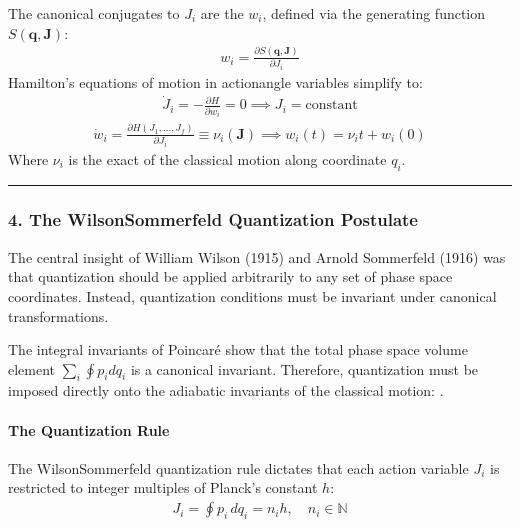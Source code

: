 \documentclass[letterpaper,10pt,english]{jupyterBook}
\begin{document}
\sphinxAtStartPar
The canonical conjugates to \(J_i\) are the  \(w_i\), defined via the generating function \(S(\mathbf{q}, \mathbf{J})\):
\begin{equation*}
\begin{split}
w_i = \frac{\partial S(\mathbf{q}, \mathbf{J})}{\partial J_i}
\end{split}
\end{equation*}
\sphinxAtStartPar
Hamilton’s equations of motion in action\sphinxhyphen{}angle variables simplify to:
\begin{equation*}
\begin{split}
\dot{J}_i = -\frac{\partial H}{\partial w_i} = 0 \implies J_i = \text{constant}
\end{split}
\end{equation*}\begin{equation*}
\begin{split}
\dot{w}_i = \frac{\partial H(J_1, \dots, J_f)}{\partial J_i} \equiv \nu_i (\mathbf{J}) \implies w_i(t) = \nu_i t + w_i(0)
\end{split}
\end{equation*}
\sphinxAtStartPar
Where \(\nu_i\) is the exact  of the classical motion along coordinate \(q_i\).


\bigskip\hrule\bigskip



\subsubsection{4. The Wilson\sphinxhyphen{}Sommerfeld Quantization Postulate}
\label{\detokenize{ch/quantum-mechanics/atom-models/analytical-mechanics-short:the-wilson-sommerfeld-quantization-postulate}}
\sphinxAtStartPar
The central insight of William Wilson (1915) and Arnold Sommerfeld (1916) was that quantization should  be applied arbitrarily to any set of phase space coordinates. Instead, quantization conditions must be invariant under canonical transformations.

\sphinxAtStartPar
The integral invariants of Poincaré show that the total phase space volume element \(\sum_i \oint p_i dq_i\) is a canonical invariant. Therefore, quantization must be imposed directly onto the adiabatic invariants of the classical motion: .


\paragraph{The Quantization Rule}
\label{\detokenize{ch/quantum-mechanics/atom-models/analytical-mechanics-short:the-quantization-rule}}
\sphinxAtStartPar
The Wilson\sphinxhyphen{}Sommerfeld quantization rule dictates that each action variable \(J_i\) is restricted to integer multiples of Planck’s constant \(h\):
\begin{equation*}
\begin{split}
J_i = \oint p_i \, dq_i = n_i h, \quad n_i \in \mathbb{N}
\end{split}
\end{equation*}
\end{document}
